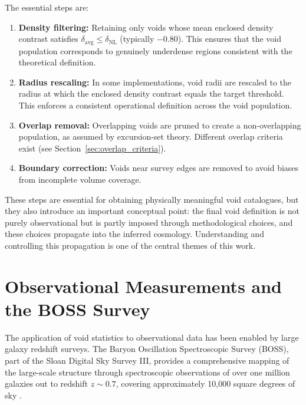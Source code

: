 \documentclass[12pt]{report}
\begin{document}
The essential steps are:

\begin{enumerate}
    \item \textbf{Density filtering:} Retaining only voids whose mean enclosed density contrast satisfies $\delta_\mathrm{avg} \leq \delta_\mathrm{NL}$ (typically $-0.80$). This ensures that the void population corresponds to genuinely underdense regions consistent with the theoretical definition.

    \item \textbf{Radius rescaling:} In some implementations, void radii are rescaled to the radius at which the enclosed density contrast equals the target threshold. This enforces a consistent operational definition across the void population.

    \item \textbf{Overlap removal:} Overlapping voids are pruned to create a non-overlapping population, as assumed by excursion-set theory. Different overlap criteria exist (see Section~\ref{sec:overlap_criteria}).

    \item \textbf{Boundary correction:} Voids near survey edges are removed to avoid biases from incomplete volume coverage.
\end{enumerate}

These steps are essential for obtaining physically meaningful void catalogues, but they also introduce an important conceptual point: the final void definition is not purely observational but is partly imposed through methodological choices, and these choices propagate into the inferred cosmology. Understanding and controlling this propagation is one of the central themes of this work.


\section{Observational Measurements and the BOSS Survey}

The application of void statistics to observational data has been enabled by large galaxy redshift surveys. The Baryon Oscillation Spectroscopic Survey (BOSS), part of the Sloan Digital Sky Survey III, provides a comprehensive mapping of the large-scale structure through spectroscopic observations of over one million galaxies out to redshift $z \sim 0.7$, covering approximately 10{,}000 square degrees of sky \citep{Reid2016}.
\end{document}

